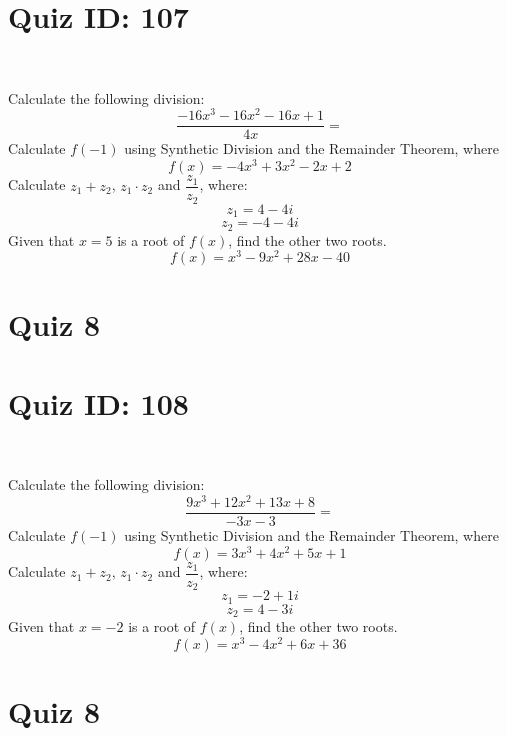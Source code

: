 \documentclass{exam}
\begin{document}
\section*{Quiz ID: 107}
\vspace{0.5cm}\
\vspace{1cm}\
\begin{questions}
\question Calculate the following division:\[\dfrac{
-16x^3 - 16x^2 - 16x + 1}{
4x}=\] \makeemptybox{\stretch{2}}
\question Calculate $f(-1)$ using Synthetic Division and the Remainder Theorem, where\[f(x) = 
-4x^3 + 3x^2 - 2x + 2\]
\newpage\question Calculate $z_1+z_2$, $z_1\cdot z_2$ and $\dfrac{z_1}{z_2}$, where:\[z_1=4-4\mathit{i}\]\[z_2=-4-4\mathit{i}\]
\question Given that $x=5$ is a root of $f(x)$, find the other two roots.\[f(x)=
x^3 - 9x^2 + 28x - 40\]\makeemptybox{\stretch{1}}
\end{questions}\newpage
\newpage
\section*{Quiz 8}
\section*{Quiz ID: 108}
\vspace{0.5cm}\
\vspace{1cm}\
\begin{questions}
\question Calculate the following division:\[\dfrac{
9x^3 + 12x^2 + 13x + 8}{
-3x - 3}=\] 
\question Calculate $f(-1)$ using Synthetic Division and the Remainder Theorem, where\[f(x) = 
3x^3 + 4x^2 + 5x + 1\]
\newpage\question Calculate $z_1+z_2$, $z_1\cdot z_2$ and $\dfrac{z_1}{z_2}$, where:\[z_1=-2+1\mathit{i}\]\[z_2=4-3\mathit{i}\]\makeemptybox{\stretch{1}}
\question Given that $x=-2$ is a root of $f(x)$, find the other two roots.\[f(x)=
x^3 - 4x^2 + 6x + 36\]\makeemptybox{\stretch{1}}
\end{questions}\newpage
\newpage
\section*{Quiz 8}
\end{document}
